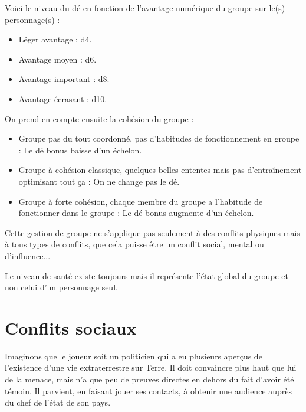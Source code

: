 \documentclass{conf/FusinaClass}
\begin{document}
Voici le niveau du dé en fonction de l'avantage numérique du groupe sur le(s) personnage(s) :

\begin{itemize}
\item Léger avantage : d4.
\item Avantage moyen : d6.
\item Avantage important : d8.
\item Avantage écrasant : d10.
\end{itemize}

On prend en compte ensuite la cohésion du groupe :

\begin{itemize}
\item Groupe pas du tout coordonné, pas d'habitudes de fonctionnement en groupe : Le dé bonus baisse d'un échelon.
\item Groupe à cohésion classique, quelques belles ententes mais pas d'entraînement optimisant tout ça : On ne change pas le dé.
\item Groupe à forte cohésion, chaque membre du groupe a l'habitude de fonctionner dans le groupe : Le dé bonus augmente d'un échelon.
\end{itemize}

Cette gestion de groupe ne s'applique pas seulement à des conflits physiques mais à tous types de conflits, que cela puisse être un conflit social, mental ou d'influence...

Le niveau de santé existe toujours mais il représente l'état global du groupe et non celui d'un personnage seul.


\chapter{Conflits sociaux}
Imaginons que le joueur soit un politicien qui a eu plusieurs aperçus de l'existence d'une vie extraterrestre sur Terre. Il doit convaincre plus haut que lui de la menace, mais n'a que peu de preuves directes en dehors du fait d'avoir été témoin. Il parvient, en faisant jouer ses contacts, à obtenir une audience auprès du chef de l'état de son pays.
\end{document}
